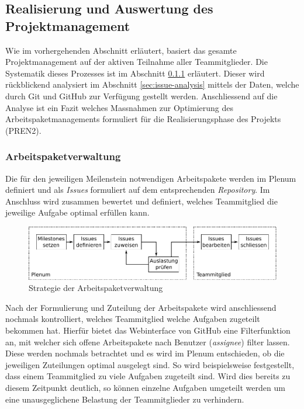\subsection{Realisierung und Auswertung des Projektmanagement}
Wie im vorhergehenden Abschnitt erläutert, basiert das gesamte
Projektmanagement auf der aktiven Teilnahme aller Teammitglieder.
Die Systematik dieses Prozesses ist im Abschnitt 
\ref{sec:issue-management} erläutert. Dieser wird rückblickend
analysiert im Abschnitt \ref{sec:issue-analysis} mittels der Daten,
welche durch Git und GitHub zur Verfügung gestellt werden.
Anschliessend auf die Analyse ist ein Fazit welches Massnahmen zur
Optimierung des Arbeitspaketmanagements formuliert für die
Realisierungsphase des Projekts (PREN2).

\subsubsection{Arbeitspaketverwaltung}\label{sec:issue-management}
Die für den jeweiligen Meilenstein notwendigen Arbeitspakete werden im
Plenum definiert und als \emph{Issues} formuliert auf dem entsprechenden
\emph{Repository}. Im Anschluss wird zusammen bewertet und definiert,
welches Teammitglied die jeweilige Aufgabe optimal erfüllen kann.

\begin{figure}[h!]
	\centering
	\includegraphics[scale=1]{../../fig/pm/issue_01.pdf}
	\caption{Strategie der Arbeitspaketverwaltung}
	\label{fig:pm-issue-01}
\end{figure}

Nach der Formulierung und Zuteilung der Arbeitspakete wird anschliessend
nochmals kontrolliert, welches Teammitglied welche Aufgaben zugeteilt
bekommen hat. Hierfür bietet das Webinterface von GitHub eine
Filterfunktion an, mit welcher sich offene Arbeitspakete nach Benutzer
(\emph{assignee}) filter lassen. Diese werden nochmals betrachtet und
es wird im Plenum entschieden, ob die jeweiligen Zuteilungen optimal
ausgelegt sind. So wird beispielsweise festgestellt, dass einem
Teammitglied zu viele Aufgaben zugeteilt sind. Wird dies bereits zu
diesem Zeitpunkt deutlich, so können einzelne Aufgaben umgeteilt werden
um eine unausgeglichene Belastung der Teammitglieder zu verhindern.

